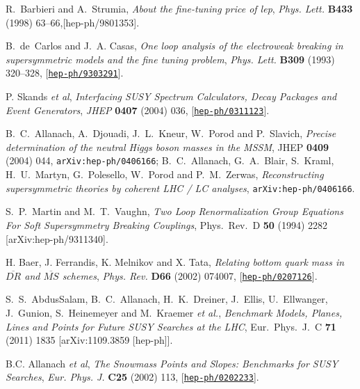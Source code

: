 \documentclass{article}
\def\hepph#1{{\tt arXiv:hep-ph/0406166}}
\begin{document}
\begin{thebibliography}{10}
R.~Barbieri and A.~Strumia, {\it About the fine-tuning price of lep},  {\em
  Phys. Lett.} {\bf B433} (1998) 63--66,[hep-ph/9801353]. 


 B.~de~Carlos and J.~A. Casas, {\it One loop analysis of the electroweak
   breaking in supersymmetric models and the fine tuning problem},  {\em Phys.
   Lett.} {\bf B309} (1993) 320--328,
   [\href{http://xxx.lanl.gov/abs/hep-ph/9303291}{{\tt hep-ph/9303291}}].

P. Skands {\em et al}, {\it Interfacing SUSY Spectrum Calculators, Decay
  Packages and Event Generators}, {\em JHEP} {\bf 0407} (2004) 036,
  [\href{http://xxx.lanl.gov/abs/hep-ph/0311123}{{\tt hep-ph/0311123}}].


B.~C.~Allanach, A.~Djouadi, J.~L.~Kneur, W.~Porod and P.~Slavich,
{\em Precise determination of the neutral Higgs boson masses in the MSSM},   JHEP {\bf 0409} (2004) 044,
\hepph{0406166};
B.~C.~Allanach, G.~A.~Blair, S.~Kraml, H.~U.~Martyn, G.~Polesello, W.~Porod and P.~M.~Zerwas,
{\em Reconstructing supersymmetric theories by coherent LHC / LC analyses},
\hepph{0403133}.

 S.~P.~Martin and M.~T.~Vaughn,
  {\em Two Loop Renormalization Group Equations For Soft Supersymmetry Breaking
  Couplings},
  Phys.\ Rev.\  D {\bf 50} (1994) 2282
  [arXiv:hep-ph/9311340].



H. Baer, J. Ferrandis, K. Melnikov and X. Tata, {\it Relating bottom quark
  mass in $\overline{DR}$ and $\overline{MS}$ schemes},
{\em Phys. Rev.} {\bf D66} (2002) 074007,
  [\href{http://xxx.lanl.gov/abs/hep-ph/0207126}{{\tt hep-ph/0207126}}].

S.~S.~AbdusSalam, B.~C.~Allanach, H.~K.~Dreiner, J.~Ellis, U.~Ellwanger, J.~Gunion, S.~Heinemeyer and M.~Kraemer {\it et al.},
  {\em Benchmark Models, Planes, Lines and Points for Future SUSY Searches at the LHC},
  Eur.\ Phys.\ J.\ C {\bf 71} (2011) 1835
  [arXiv:1109.3859 [hep-ph]].

B.C. Allanach {\em et al}, {\it The Snowmass Points and Slopes: Benchmarks for
  SUSY Searches}, {\em Eur. Phys. J.} {\bf C25} (2002) 113,
 [\href{http://xxx.lanl.gov/abs/hep-ph/0202233}{{\tt hep-ph/0202233}}].



\end{thebibliography}
\end{document}
